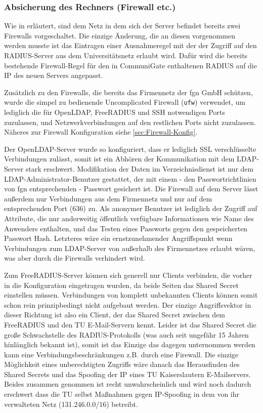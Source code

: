\documentclass[11pt,a4paper,titlepage=firstiscover,headsepline,bibtotoc]{scrartcl} %
\begin{document}
\subsubsection{Absicherung des Rechners (Firewall etc.)}
Wie in  erläutert, sind dem Netz in dem sich der Server befindet bereits zwei Firewalls vorgeschaltet. Die einzige Änderung, die an diesen vorgenommen werden musste ist das Eintragen einer Ausnahmeregel mit der der Zugriff auf den RADIUS-Server aus dem Universitätsnetz erlaubt wird. Dafür wird die bereits bestehende Firewall-Regel für den in CommuniGate enthaltenen RADIUS auf die IP des neuen Servers angepasst.

Zusätzlich zu den Firewalls, die bereits das Firmennetz der fgn GmbH schützen, wurde die simpel zu bedienende Uncomplicated Firewall (\texttt{ufw}) verwendet, um lediglich die für OpenLDAP, FreeRADIUS und SSH notwendigen Ports zuzulassen, und Netzwerkverbindungen auf den restlichen Ports nicht zuzulassen. Näheres zur Firewall Konfiguration siehe \autoref{sec:Firewall-Konfig}.

Der OpenLDAP-Server wurde so konfiguriert, dass er lediglich SSL verschlüsselte Verbindungen zulässt, somit ist ein Abhören der Kommunikation mit dem LDAP-Server stark erschwert. Modifikation der Daten im Verzeichnisdienst ist nur dem LDAP-Administrator-Benutzer gestattet, der mit einem - den Passwortrichtlinien von fgn entsprechenden - Passwort gesichert ist. Die Firewall auf dem Server lässt außerdem nur Verbindungen aus dem Firmennetz und nur auf dem entsprechenden Port (636) zu. Als anonymer Benutzer ist lediglich der Zugriff auf Attribute, die nur anderweitig öffentlich verfügbare Informationen wie Name des Anwenders enthalten, und das Testen eines Passworts gegen den gespeicherten Passwort Hash. Letzteres wäre ein ernstzunehmender Angriffspunkt wenn Verbindungen zum LDAP-Server von außerhalb des Firmennetzes erlaubt wären, was aber durch die Firewalls verhindert wird.

Zum FreeRADIUS-Server können sich generell nur Clients verbinden, die vorher in die Konfiguration eingetragen wurden, da beide Seiten das Shared Secret einstellen müssen. Verbindungen von komplett unbekannten Clients können somit schon rein prinzipbedingt nicht aufgebaut werden. Der einzige Angriffsvektor in dieser Richtung ist also ein Client, der das Shared Secret zwischen dem FreeRADIUS und den TU E-Mail-Servern kennt. Leider ist das Shared Secret die große Schwachstelle des RADIUS-Protokolls (was auch seit ungefähr 15 Jahren hinlänglich bekannt ist), somit ist das Einzige das dagegen unternommen werden kann eine Verbindungsbeschränkungen z.B. durch eine Firewall. Die einzige Möglichkeit eines unberechtigten Zugriffs wäre danach das Herausfinden des Shared Secrets und das Spoofing der IP eines TU Kaiserslautern E-Mailservers. Beides zusammen genommen ist recht unwahrscheinlich und wird noch dadurch erschwert dass die TU selbst Maßnahmen gegen IP-Spoofing in dem von ihr verwalteten Netz (131.246.0.0/16) betreibt.
\end{document}
